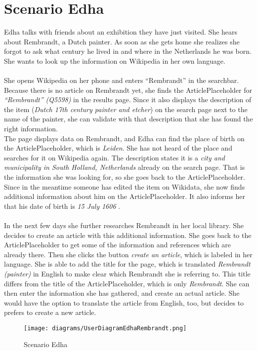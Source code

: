 \section{Scenario Edha} 
Edha talks with friends about an exhibition they have just visited. She hears about Rembrandt, a Dutch painter. As soon as she gets home she realizes she forgot to ask what century he lived in and where in the Netherlands he was born. She wants to look up the information on Wikipedia in her own language. \\
\\ 
She opens Wikipedia on her phone and enters ``Rembrandt'' in the searchbar. Because there is no article on Rembrandt yet, she finds the ArticlePlaceholder for \textit{``Rembrandt'' (Q5598)} \citep{wd:01} in the results page. Since it also displays the description of the item (\textit{Dutch 17th century painter and etcher}) on the search page next to the name of the painter, she can validate with that description that she has found the right information. \\
The page displays data on Rembrandt, and Edha can find the place of birth on the ArticlePlaceholder, which is \textit{Leiden}. She has not heard of the place and searches for it on Wikipedia again. The description states it is a \textit{city and municipality in South Holland, Netherlands} \citep{wd:02} already on the search page. That is the information she was looking for, so she goes back to the ArticlePlaceholder. Since in the meantime someone has edited the item on Wikidata, she now finds additional information about him on the ArticlePlaceholder. It also informs her that his date of birth is \textit{15 July 1606} \citep{wd:01}. \\
\\
In the next few days she further researches Rembrandt in her local library. She decides to create an article with this additional information. She goes back to the ArticlePlaceholder to get some of the information and references which are already there. Then she clicks the button \textit{create an article}, which is labeled in her language. She is able to add the title for the page, which is translated \textit{Rembrandt (painter)} in English to make clear which Rembrandt she is referring to. This title differs from the title of the ArticlePlaceholder, which is only \textit{Rembrandt}. She can then enter the information she has gathered, and create an actual article. She would have the option to translate the article from English, too, but decides to prefers to create a new article.
\begin{figure}[H]
	\centering
	\texttt{[image: diagrams/UserDiagramEdhaRembrandt.png]}
	\caption{Scenario Edha}
	\label{fig:ScenarioEdha}
\end{figure}

